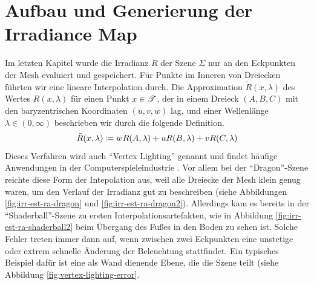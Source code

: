 \section{Aufbau und Generierung der Irradiance Map} %
\label{sec:aufbau_und_generierung_der_irradiance_map}

	Im letzten Kapitel wurde die Irradianz $R$ der Szene $\Sigma$ nur an den Eckpunkten der Mesh evaluiert und gespeichert.
	Für Punkte im Inneren von Dreiecken führten wir eine lineare Interpolation durch.
	Die Approximation $\tilde{R}(x,\lambda)$ des Wertes $R(x,\lambda)$ für einen Punkt $x\in\mathscr{T}$, der in einem Dreieck $(A,B,C)$ mit den baryzentrischen Koordinaten $(u,v,w)$ lag, und einer Wellenlänge $\lambda\in (0,\infty)$ beschrieben wir durch die folgende Definition.
	\[
		\tilde{R}(x,\lambda) \coloneqq w R(A,\lambda) + u R(B,\lambda) + v R(C,\lambda)
	\]
	Dieses Verfahren wird auch \enquote{Vertex Lighting} genannt und findet häufige Anwendungen in der Computerspieleindustrie \cite{tricks-game}.
	Vor allem bei der \enquote{Dragon}-Szene reichte diese Form der Intepolation aus, weil alle Dreiecke der Mesh klein genug waren, um den Verlauf der Irradianz gut zu beschreiben (siehe Abbildungen \ref{fig:irr-est-ra-dragon} und \ref{fig:irr-est-ra-dragon2}).
	Allerdings kam es bereits in der \enquote{Shaderball}-Szene zu ersten Interpolationsartefakten, wie in Abbildung \ref{fig:irr-est-ra-shaderball2} beim Übergang des Fußes in den Boden zu sehen ist.
	Solche Fehler treten immer dann auf, wenn zwischen zwei Eckpunkten eine unstetige oder extrem schnelle Änderung der Beleuchtung stattfindet.
	Ein typisches Beispiel dafür ist eine als Wand dienende Ebene, die die Szene teilt (siehe Abbildung \ref{fig:vertex-lighting-error}.


